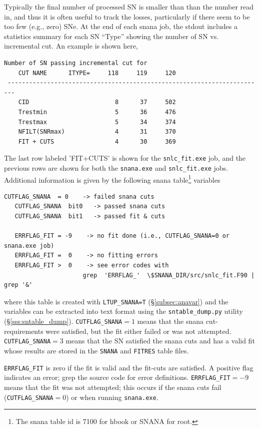\documentclass[12pt]{article}
\begin{document}
Typically the final number of processed SN
is smaller than than the number read in,
and thus it is often useful to track the losses,
particularly if there seem to be too few (e.g., zero)
SNe. At the end of each snana job, the stdout includes
a statistics summary for each SN ``Type'' showing
the number of SN vs. incremental cut. An example 
is shown here,
%
\begin{Verbatim}[frame=single] 
                          Number of SN passing incremental cut for
    CUT NAME      ITYPE=     118     119     120  
 ------------------------------------------------------------------------
    CID                        8      37     502  
    Trestmin                   5      36     476  
    Trestmax                   5      34     374  
    NFILT(SNRmax)              4      31     370  
    FIT + CUTS                 4      30     369  
\end{Verbatim}
%
The last row labeled 'FIT+CUTS' is shown 
for the {\tt snlc\_fit.exe} job,
and the previous rows are shown for both the
{\tt snana.exe} and {\tt snlc\_fit.exe} jobs.
Additional information is given by the following
snana table\footnote{The snana table id is 7100 for hbook or SNANA for root.}
variables
\begin{Verbatim}[frame=single] 
   CUTFLAG_SNANA  = 0    -> failed snana cuts
   CUTFLAG_SNANA  bit0   -> passed snana cuts
   CUTFLAG_SNANA  bit1   -> passed fit & cuts

   ERRFLAG_FIT = -9    -> no fit done (i.e., CUTFLAG_SNANA=0 or snana.exe job)
   ERRFLAG_FIT =  0    -> no fitting errors
   ERRFLAG_FIT >  0    -> see error codes with
                      grep  'ERRFLAG_'  \$SNANA_DIR/src/snlc_fit.F90 | grep '&'
\end{Verbatim}
%
where this table is created with {\tt LTUP\_SNANA=T}
(\S\ref{subsec:anavar}) and the variables can be
extracted into text format using the {\tt sntable\_dump.py}
utility (\S\ref{sss:sntable_dump}).
{\tt CUTFLAG\_SNANA}$=1$ means that the snana cut-requirements
were satisfied, but the fit either failed or was not attempted.
{\tt CUTFLAG\_SNANA}$=3$ means that the SN satisfied the snana cuts
and has a valid fit whose results are stored in the {\tt SNANA} and {\tt FITRES} table files.

{\tt ERRFLAG\_FIT} is zero if the fit is valid and the
fit-cuts are satisfied. A positive flag indicates an
error; grep the source code for error definitions.
{\tt ERRFLAG\_FIT}$=-9$ means that the fit was not
attempted; this occurs if the snana cuts fail
({\tt CUTFLAG\_SNANA}$=0$) or when running {\tt snana.exe}.
\end{document}

